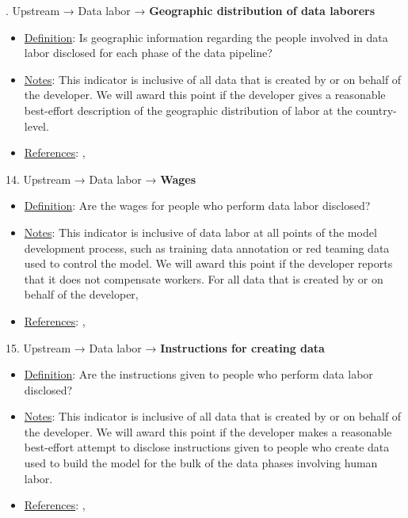 . Upstream → Data labor → \textbf{Geographic distribution of data laborers}
\vspace{-\parskip}
\begin{itemize}
\item
\underline{Definition}: Is geographic information regarding the people involved in data labor disclosed for each phase of the data pipeline?
\item
\underline{Notes}: This indicator is inclusive of all data that is created by or on behalf of the developer. We will award this point if the developer gives a reasonable best-effort description of the geographic distribution of labor at the country-level.
\item
\underline{References}: \citet{hao2023cleaning}, \citet{gray2019ghost}
\end{itemize} \vspace{\baselineskip}


14. Upstream → Data labor → \textbf{Wages}
\vspace{-\parskip}
\begin{itemize}
\item
\underline{Definition}: Are the wages for people who perform data labor disclosed?
\item
\underline{Notes}: This indicator is inclusive of data labor at all points of the model development process, such as training data annotation or red teaming data used to control the model. We will award this point if the developer reports that it does not compensate workers. For all data that is created by or on behalf of the developer, 
\item
\underline{References}: \citet{kittur2013future}, \citet{dzieza2023ai}
\end{itemize} \vspace{\baselineskip}


15. Upstream → Data labor → \textbf{Instructions for creating data}
\vspace{-\parskip}
\begin{itemize}
\item
\underline{Definition}: Are the instructions given to people who perform data labor disclosed?
\item
\underline{Notes}: This indicator is inclusive of all data that is created by or on behalf of the developer. We will award this point if the developer makes a reasonable best-effort attempt to disclose instructions given to people who create data used to build the model for the bulk of the data phases involving human labor.
\item
\underline{References}: \citet{sambasivan2021everyone}, \citet{kittur2013future}
\end{itemize} \vspace{\baselineskip}


